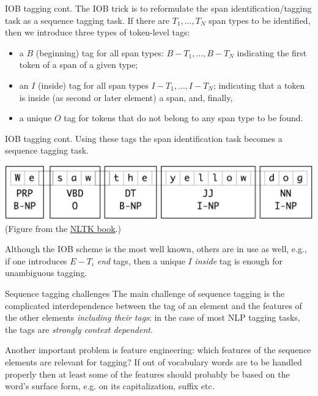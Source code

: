 \documentclass[style=upen, size=14pt]{powerdot}
\newcommand{\gold}{\color{arany}}
\theoremstyle{definition}
\begin{document}
 \begin{slide}[toc=]{IOB tagging cont.} 
   The IOB trick is to reformulate the span identification/tagging task as a
   sequence tagging task. If there are $T_1,\dots,T_N$ span types to be
   identified, then we introduce three types of token-level tags:
   \begin{itemize}
   \item a $B$ (beginning) tag for all span types: $B-T_1,\dots,B-T_N$
     indicating the first token of a span of a given type;
   \item an $I$ (inside) tag for all span types $I-T_1,\dots,I-T_N$; indicating
     that a token is inside (as second or later element) a span, and, finally,
   \item a unique $O$ tag for tokens that do not belong to any span type to be
     found.
   \end{itemize}
 \end{slide}
 
 \begin{slide}[toc=]{IOB tagging cont.}
   Using these tags the span identification task becomes a sequence tagging
   task.
   
   \begin{center}
     \includegraphics[width=1.0\textwidth]{figures/iob2.eps}
     \footnotesize(Figure from the \href{http://www.nltk.org/book/ch07.html}{NLTK book}.)
    \end{center}
    
    
    Although the IOB scheme is the most well known, others are in use as well,
    e.g., if one introduces $E-T_i$ \emph{end} tags, then a unique $I$
    \textit{inside} tag is enough for unambiguous tagging.
  \end{slide}

  \begin{slide}[toc=Challenges]{Sequence tagging challenges}
    The main challenge of sequence tagging is the complicated interdependence
    between the tag of an element and the features of the other elements
    \emph{including their tags}: in the case of most NLP tagging tasks, the
    tags are \emph{\gold strongly context dependent}.\bigskip

    Another important problem is feature engineering: which features of the
    sequence elements are relevant for tagging? If out of vocabulary words are
    to be handled properly then at least some of the features should probably be
    based on the word's surface form, e.g. on its capitalization, suffix etc.    
  \end{slide}
  
\end{document}
